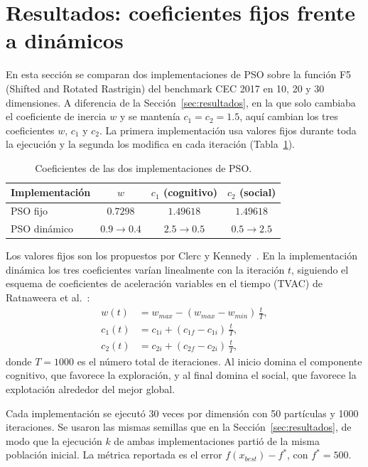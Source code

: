 \section{Resultados: coeficientes fijos frente a dinámicos}
\label{sec:resultados_dinamicos}

En esta sección se comparan dos implementaciones de PSO sobre la función F5 (Shifted and Rotated Rastrigin) del benchmark CEC 2017 en 10, 20 y 30 dimensiones. A diferencia de la Sección~\ref{sec:resultados}, en la que solo cambiaba el coeficiente de inercia $w$ y se mantenía $c_1 = c_2 = 1.5$, aquí cambian los tres coeficientes $w$, $c_1$ y $c_2$. La primera implementación usa valores fijos durante toda la ejecución y la segunda los modifica en cada iteración (Tabla~\ref{tab:coeficientes}).

\begin{table}[H]
\centering
\caption{Coeficientes de las dos implementaciones de PSO.}
\label{tab:coeficientes}
\begin{tabular}{lccc}
\toprule
Implementación & $w$ & $c_1$ (cognitivo) & $c_2$ (social) \\
\midrule
PSO fijo & $0.7298$ & $1.49618$ & $1.49618$ \\
PSO dinámico & $0.9 \to 0.4$ & $2.5 \to 0.5$ & $0.5 \to 2.5$ \\
\bottomrule
\end{tabular}
\end{table}

Los valores fijos son los propuestos por Clerc y Kennedy~\cite{clerc2002particle}. En la implementación dinámica los tres coeficientes varían linealmente con la iteración $t$, siguiendo el esquema de coeficientes de aceleración variables en el tiempo (TVAC) de Ratnaweera et al.~\cite{ratnaweera2004self}:
\begin{align}
w(t)   &= w_{max} - (w_{max}-w_{min})\,\frac{t}{T}, \label{eq:tvac_w}\\
c_1(t) &= c_{1i} + (c_{1f}-c_{1i})\,\frac{t}{T}, \label{eq:tvac_c1}\\
c_2(t) &= c_{2i} + (c_{2f}-c_{2i})\,\frac{t}{T}, \label{eq:tvac_c2}
\end{align}
donde $T = 1000$ es el número total de iteraciones. Al inicio domina el componente cognitivo, que favorece la exploración, y al final domina el social, que favorece la explotación alrededor del mejor global.

Cada implementación se ejecutó 30 veces por dimensión con 50 partículas y 1000 iteraciones. Se usaron las mismas semillas que en la Sección~\ref{sec:resultados}, de modo que la ejecución $k$ de ambas implementaciones partió de la misma población inicial. La métrica reportada es el error $f(x_{best}) - f^*$, con $f^* = 500$.

